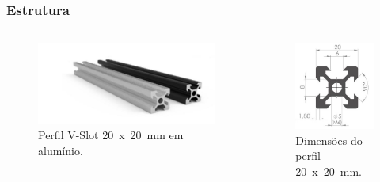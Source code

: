 \begin{frame}
\frametitle{Estrutura}
\begin{columns}
    \begin{figure}
        \centering
        \includegraphics[scale = 0.20]{figuras/p20x20p}
        \caption{Perfil V-Slot 20~x~20~mm em alumínio.}
    \end{figure}    
    \begin{figure}
        \centering
        \includegraphics[scale = 0.20]{figuras/p20x20d}
        \caption{Dimensões do perfil 20~x~20~mm.}
    \end{figure}    
\end{columns}    
\end{frame}

